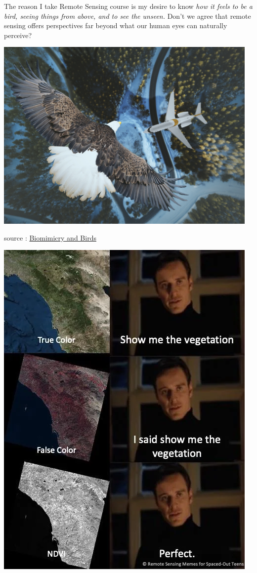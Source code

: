 \documentclass[
  letterpaper,
  DIV=11,
  numbers=noendperiod]{scrreprt}
\begin{document}
The reason I take Remote Sensing course is my desire to know \emph{how
it feels to be a bird, seeing things from above, and to see the unseen.}
Don't we agree that remote sensing offers perspectives far beyond what
our human eyes can naturally perceive?

\includegraphics[width=5.07292in,height=\textheight]{images/clipboard-2217286199.png}

source :
\href{https://chirpforbirds.com/nature-advocacy/biomimicry-and-birds/}{Biomimicry
and Birds}

\includegraphics{images/ggd7oxp59qb31.jpeg}
\end{document}

